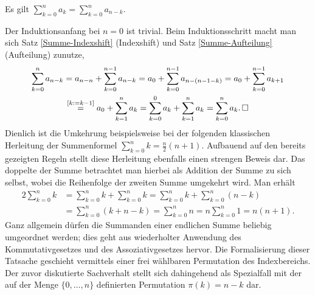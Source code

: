 \begin{Satz}%
\label{Summe-Umkehrung}\newlinefirst
Es gilt $\sum_{k=0}^n a_k = \sum_{k=0}^n a_{n-k}$.
\end{Satz}
Der Induktionsanfang bei $n=0$ ist trivial. Beim Induktionsschritt
macht man sich Satz \ref{Summe-Indexshift} (Indexshift) und
Satz \ref{Summe-Aufteilung} (Aufteilung) zunutze,%
\begin{gather*}
\sum_{k=0}^n a_{n-k} = a_{n-n}+\sum_{k=0}^{n-1} a_{n-k}
= a_0+\sum_{k=0}^{n-1} a_{n-(n-1-k)}
= a_0+\sum_{k=0}^{n-1} a_{k+1}\\
\stackrel{[k:=k-1]}= a_0+\sum_{k=1}^n a_k
= \sum_{k=0}^0 a_k + \sum_{k=1}^n a_k
= \sum_{k=0}^n a_k.\,\Box
\end{gather*}
Dienlich ist die Umkehrung beispielsweise bei der folgenden klassischen
Herleitung der Summenformel $\sum_{k=0}^n k = \tfrac{n}{2}(n+1)$. 
Aufbauend auf den bereits gezeigten Regeln stellt diese Herleitung ebenfalls
einen strengen Beweis dar. Das doppelte der Summe betrachtet man hierbei
als Addition der Summe zu sich selbst, wobei die Reihenfolge der zweiten
Summe umgekehrt wird. Man erhält%
\begin{align*}
2\sum_{k=0}^n k &= \sum_{k=0}^n k+\sum_{k=0}^n k
= \sum_{k=0}^n k + \sum_{k=0}^n (n-k)\\
&= \sum_{k=0}^n (k+n-k) = \sum_{k=0}^n n
= n\sum_{k=0}^n 1 = n(n+1).
\end{align*}
Ganz allgemein dürfen die Summanden einer endlichen Summe beliebig
umgeordnet werden; dies geht aus wiederholter Anwendung des Kommutativgesetzes
und des Assoziativgesetzes hervor. Die Formalisierung dieser Tatsache
geschieht vermittels einer frei wählbaren Permutation des Indexbereichs.
Der zuvor diskutierte Sachverhalt stellt sich dahingehend als
Spezialfall mit der auf der Menge $\{0,\ldots,n\}$ definierten
Permutation $\pi(k) = n-k$ dar.

